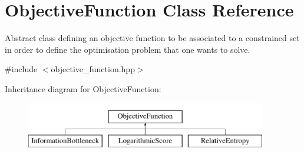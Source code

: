 \hypertarget{classObjectiveFunction}{\section{Objective\-Function Class Reference}
\label{classObjectiveFunction}
}


Abstract class defining an objective function to be associated to a constrained set in order to define the optimisation problem that one wants to solve.  




{\ttfamily \#include $<$objective\-\_\-function.\-hpp$>$}

Inheritance diagram for Objective\-Function\-:\begin{figure}[H]
\begin{center}
\leavevmode
\includegraphics[height=2.000000cm]{classObjectiveFunction}
\end{center}
\end{figure}
